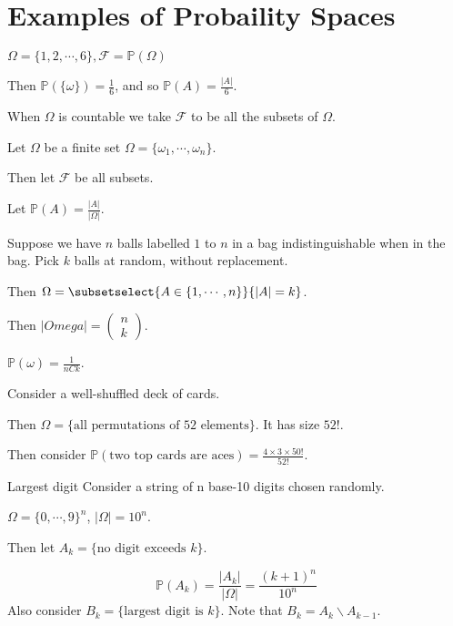 \documentclass[../Main.tex]{subfiles}
\begin{document}
\section{Examples of Probaility Spaces}
\begin{example}
    $\Omega = \{1, 2, \cdots, 6\}, \mathcal{F} = \mathbb{P}(\Omega)$\par %
        Then $\mathbb{P}(\{\omega\}) = \frac{1}{6}$, and so $\mathbb{P}(A) = \frac{|A|}{6}$.
\end{example}
\begin{remark}
    When $\Omega$ is countable we take $\mathcal{F}$ to be all the subsets of $\Omega$.
\end{remark}
\begin{example}
    Let $\Omega$ be a finite set $\Omega = \{\omega_1, \cdots, \omega_n\}$.\par
    Then let $\mathcal{F}$ be all subsets.\par
    Let $\mathbb{P}(A) = \frac{|A|}{|\Omega|}$.
\end{example}
\begin{example}
    Suppose we have $n$ balls labelled $1$ to $n$ in a bag indistinguishable when in the bag. Pick $k$ balls at random, without replacement.\par
    Then $\Omega = \subsetselect{A \in \{1, \cdots, n\}}{|A| = k}$.\par
    Then $|Omega| = \begin{pmatrix}n \\ k\end{pmatrix}$.\par
    $\mathbb{P}(\omega) = \frac{1}{nCk}$.
\end{example}
\begin{example}
    Consider a well-shuffled deck of cards.\par
    Then $\Omega = \{\text{all permutations of 52 elements}\}$. It has size $52!$.\par
    Then consider $\mathbb{P}(\text{two top cards are aces}) = \frac{4 \times 3 \times 50!}{52!}$.
\end{example}
\begin{example}{Largest digit}
    Consider a string of n base-10 digits chosen randomly.\par
    $\Omega = \{0, \cdots, 9\}^n$, $|\Omega| = 10^n$.\par
    Then let $A_k=\{\text{no digit exceeds } k\}$.\par
    \begin{equation*}
        \mathbb{P}(A_k) = \frac{|A_k|}{|\Omega|} = \frac{(k + 1)^n}{10^n}
    \end{equation*}
    Also consider $B_k = \{\text{largest digit is } k\}$. Note that $B_k = A_k \backslash A_{k - 1}$.
\end{example}
\end{document}
